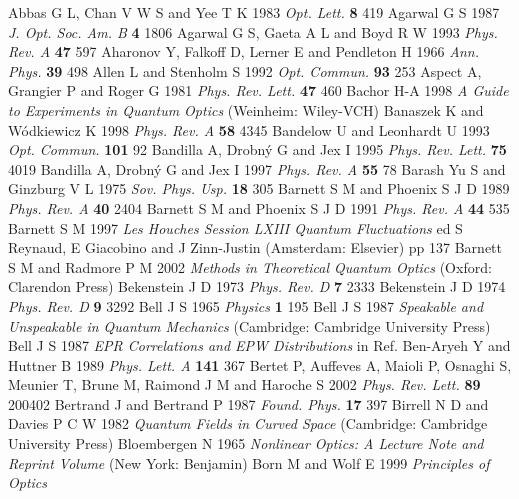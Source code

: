 \documentclass[12pt,amsmath,amssymb]{article}
\numberwithin{equation}{section}
\begin{document}
\begin{thebibliography}{999}
Abbas G L, Chan V W S and Yee T K 1983
{\it Opt. Lett.} {\bf 8} 419
Agarwal G S 1987 {\it J. Opt. Soc. Am. B } {\bf 4} 1806
Agarwal G S, Gaeta A L and Boyd R W 1993
{\it Phys. Rev. A} {\bf 47} 597
Aharonov Y, Falkoff D, Lerner E and Pendleton H 1966 {\it Ann.
Phys.} {\bf 39} 498
Allen L and Stenholm S 1992
{\it Opt. Commun.} {\bf 93} 253
Aspect A, Grangier P and Roger G 1981
{\it Phys. Rev. Lett.} {\bf 47} 460
Bachor H-A 1998
{\it A Guide to Experiments in Quantum Optics}
(Weinheim: Wiley-VCH)
Banaszek K and W\'odkiewicz K 1998
{\it Phys. Rev. A} {\bf 58} 4345
Bandelow U and Leonhardt U 1993
{\it Opt. Commun.} {\bf 101} 92
Bandilla A, Drobn\'y G and Jex I 1995 {\it Phys. Rev. Lett.} {\bf
75} 4019
Bandilla A, Drobn\'y G and Jex I 1997 {\it Phys. Rev. A} {\bf
55} 78
Barash Yu S and Ginzburg V L 1975
{\it Sov. Phys. Usp.} {\bf 18} 305
Barnett S M and Phoenix S J D 1989
{\it Phys. Rev. A} {\bf 40} 2404
Barnett S M and Phoenix S J D 1991
{\it Phys. Rev. A} {\bf 44} 535
Barnett S M 1997
{\it Les Houches Session LXIII Quantum Fluctuations}
ed S Reynaud, E Giacobino and J Zinn-Justin
(Amsterdam: Elsevier) pp 137
Barnett S M and Radmore P M 2002
{\it Methods in Theoretical Quantum Optics}
(Oxford: Clarendon Press)
Bekenstein J D 1973
{\it Phys. Rev. D} {\bf 7} 2333
Bekenstein J D 1974
{\it Phys. Rev. D} {\bf 9} 3292
Bell J S 1965 {\it Physics} {\bf 1} 195
Bell J S 1987 {\it Speakable and Unspeakable in Quantum
Mechanics} (Cambridge: Cambridge University Press)
Bell J S 1987 {\it EPR Correlations and EPW Distributions}
in Ref. \cite{Bell}
Ben-Aryeh Y and Huttner B 1989
{\it Phys. Lett. A} {\bf 141} 367
Bertet P, Auffeves A, Maioli P, Osnaghi S, Meunier T, Brune M,
Raimond J M and Haroche S 2002
{\it Phys. Rev. Lett.} {\bf 89} 200402
Bertrand J and Bertrand P 1987 {\it Found. Phys.} {\bf 17} 397
Birrell N D and Davies P C W 1982
{\it Quantum Fields in Curved Space}
(Cambridge: Cambridge University Press)
Bloembergen N 1965
{\it Nonlinear Optics: A Lecture Note and Reprint Volume}
(New York: Benjamin)
Born M and Wolf E 1999 {\it Principles of Optics}

\end{thebibliography}
\end{document}

